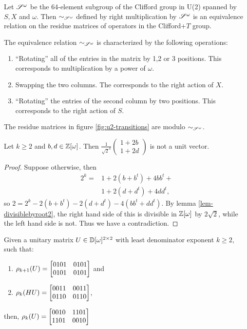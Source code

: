 \begin{definition}
  Let ${\mathscr{S}^\omega}$ be the 64-element subgroup of the Clifford group in U(2) spanned by $S, X$ and
  $\omega$. Then $\sim_{\mathscr{S}^\omega}$ defined by right multiplication by ${\mathscr{S}^\omega}$ is an equivalence relation on
  the residue matrices of operators in the Clifford+$T$ group.
\end{definition}
\begin{remark}
  The equivalence relation $\sim_{\mathscr{S}^\omega}$ is characterized by the following operations:
  \begin{enumerate}
    \item ``Rotating'' all of the entries in the matrix by 1,2 or 3 positions. This corresponds to
      multiplication by a power of $\omega$.
    \item Swapping the two columns. The corresponds to the right action of $X$.
    \item ``Rotating'' the entries of the second column by two positions. This corresponds to the
      right action of $S$.
  \end{enumerate}
\end{remark}
\begin{remark}
  The residue matrices in figure \ref{fig:u2-transitions} are modulo $\sim_{\mathscr{S}^\omega}$.
\end{remark}
\begin{lemma}\label{lem-columncannotbe1s}
  Let $k\ge2$ and $b,d \in \mathbb{Z}[\omega]$. Then $\frac{1}{\sqrt{2}^k}\begin{pmatrix}1+2b\\1+2d\end{pmatrix}$
  is not a unit vector.
\end{lemma}
\begin{proof}
  Suppose otherwise, then
  \begin{align*}
    2^k = &1+2(b+b^t) +4bb^t +\\
          &1+2(d+d^t) +4dd^t,
  \end{align*}
  so $2 = 2^k - 2(b+b^t) - 2(d+d^t) - 4(bb^t + dd^t)$. By lemma \ref{lem-divisiblebyroot2}, the
  right hand side of this is divisible in $\mathbb{Z}[\omega]$ by $2 \sqrt{2}$, while the left hand side is not.
  Thus we have a contradiction.
\end{proof}
\begin{lemma}\label{lem-reduction}
  Given a unitary matrix $U \in \mathbb{D}[\omega]^{2\times2}$ with least denominator exponent $k\ge2$, such that:
  \begin{enumerate}
    \item $\rho_{k+1}(U) = \begin{bmatrix}0101&0101\\0101&0101\end{bmatrix}$ and
    \item $\rho_k(H U) = \begin{bmatrix}0011&0011\\0110&0110\end{bmatrix}$,
  \end{enumerate}
  then, $\rho_k(U) = \begin{bmatrix}0010&1101\\1101&0010\end{bmatrix}$
\end{lemma}
